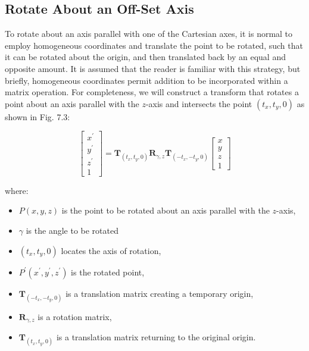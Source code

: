 \documentclass[10pt]{article}
\begin{document}
\subsection{Rotate About an Off-Set Axis}
To rotate about an axis parallel with one of the Cartesian axes, it is normal to employ homogeneous coordinates and translate the point to be rotated, such that it can be rotated about the origin, and then translated back by an equal and opposite amount. It is assumed that the reader is familiar with this strategy, but briefly, homogeneous coordinates permit addition to be incorporated within a matrix operation. For completeness, we will construct a transform that rotates a point about an axis parallel with the $z$-axis and intersects the point $\left(t_{x}, t_{y}, 0\right)$ as shown in Fig. 7.3:

$$
\left[\begin{array}{c}
x^{\prime} \\
y^{\prime} \\
z^{\prime} \\
1
\end{array}\right]=\mathbf{T}_{\left(t_{x}, t_{y}, 0\right)} \mathbf{R}_{\gamma, z} \mathbf{T}_{\left(-t_{x},-t_{y}, 0\right)}\left[\begin{array}{l}
x \\
y \\
z \\
1
\end{array}\right]
$$

where:

\begin{itemize}
  \item $P(x, y, z)$ is the point to be rotated about an axis parallel with the $z$-axis,

  \item $\gamma$ is the angle to be rotated

  \item $\left(t_{x}, t_{y}, 0\right)$ locates the axis of rotation,

  \item $P^{\prime}\left(x^{\prime}, y^{\prime}, z^{\prime}\right)$ is the rotated point,

  \item $\mathbf{T}_{\left(-t_{x},-t_{y}, 0\right)}$ is a translation matrix creating a temporary origin,

  \item $\mathbf{R}_{\gamma, z}$ is a rotation matrix,

  \item $\mathbf{T}_{\left(t_{x}, t_{y}, 0\right)}$ is a translation matrix returning to the original origin.

\end{itemize}
\end{document}
